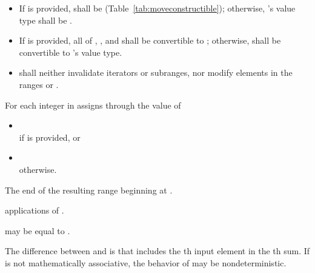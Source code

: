\begin{itemdescr}
\pnum
\requires
\begin{itemize}
\item If  is provided,  shall be 
(Table~\ref{tab:moveconstructible}); otherwise, 's value
type shall be .

\item If  is provided, all of ,
, and  shall be
convertible to ; otherwise,  shall be
convertible to 's value type.

\item {} shall neither invalidate iterators or subranges, nor
modify elements in the ranges  or
.
\end{itemize}

\pnum
\effects
For each integer  in 
assigns through  the value of
\begin{itemize}
\item
  \\if {} is provided, or
\item
  \\otherwise.
\end{itemize}

\pnum
\returns
The end of the resulting range beginning at .

\pnum
\complexity
{} applications of .

\pnum
\remarks
{} may be equal to .

\pnum
\begin{note}
The difference between  and  is
that  includes the th input element in the
th sum.  If  is not mathematically associative, the
behavior of  may be nondeterministic.
\end{note}
\end{itemdescr}

